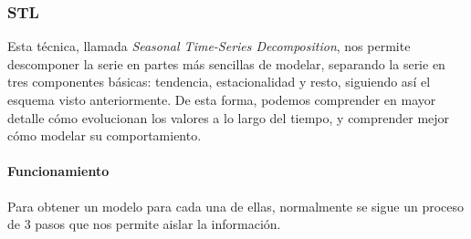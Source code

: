 \subsubsection{STL}

Esta técnica, llamada \textit{Seasonal Time-Series Decomposition}, nos permite descomponer la serie en partes más sencillas de modelar, separando la serie en tres componentes básicas: tendencia, estacionalidad y resto, siguiendo así el esquema visto anteriormente. De esta forma, podemos comprender en mayor detalle cómo evolucionan los valores a lo largo del tiempo, y comprender mejor cómo modelar su comportamiento.

\paragraph{Funcionamiento}


Para obtener un modelo para cada una de ellas,  normalmente se sigue un proceso de 3 pasos que nos permite aislar la información.

